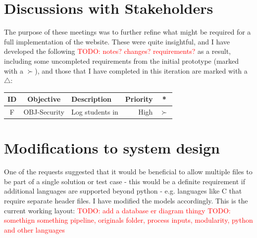 \documentclass[a4paper,11pt]{report}
\newcommand{\todo}[1]{\textcolor{red}{TODO: #1}}
\newcounter{FunCount}
\newcommand{\freq}[4]{\addtocounter{FunCount}{1}F\arabic{FunCount} & OBJ-#1 & #2 & #3 & #4\\}
\begin{document}
\section{Discussions with Stakeholders}
The purpose of these meetings was to further refine what might be required for a full implementation of the website. These were quite insightful, and I have developed the following \todo{notes? changes? requirements?} as a result, including some uncompleted requirements from the initial prototype (marked with a $\succ$), and those that I have completed in this iteration are marked with a $\bigtriangleup$:
\begin{longtable}{cclrc}
\textbf{ID} & \textbf{Objective} & \textbf{Description} & \textbf{Priority} & \textbf{*}\\\hline
\freq{Security}{Log students in}{High}{$\succ$}
\end{longtable}

\section{Modifications to system design}
One of the requests suggested that it would be beneficial to allow multiple files to be part of a single solution or test case - this would be a definite requirement if additional languages are supported beyond python - e.g. languages like C that require separate header files. I have modified the models accordingly. This is the current working layout:
\todo{add a database er diagram thingy}
\todo{somethign something pipeline, originals folder, process inputs, modularity, python and other languages}
\end{document}
